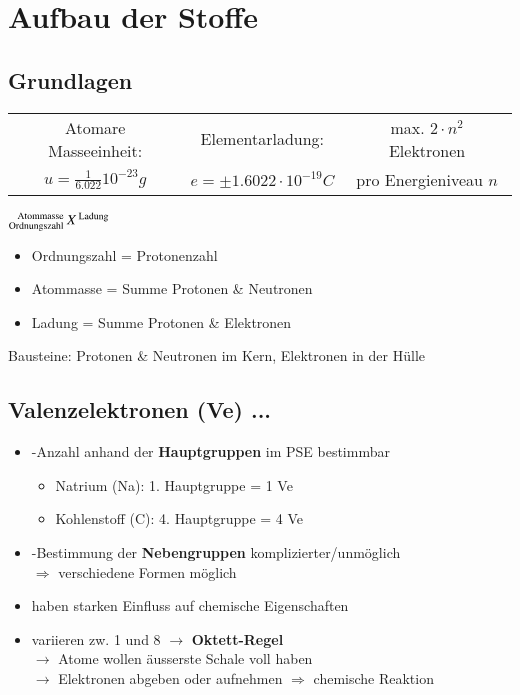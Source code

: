 \section{Aufbau der Stoffe}

\subsection{Grundlagen}
\begin{center}
    \begin{tabular}{|c|c|c|}\hline
        Atomare Masseeinheit:               & Elementarladung:         & max. $2 \cdot n^{2}$ Elektronen \\ 
        $u = \frac{1}{6.022}10^{-23}g$      & $e = \pm 1.6022 \cdot 10^{-19}C$ & pro Energieniveau $n$ \\ \hline
    \end{tabular}
\end{center}


\begin{minipage}{0.25\linewidth}
    $ \prescript{\text{Atommasse }}{\text{Ordnungszahl }}{X}^{\text{ Ladung}} $
\end{minipage}
\hfill
\begin{minipage}{0.65\linewidth}
    \begin{itemize}[itemsep=1pt, parsep=0pt]
        \item Ordnungszahl = Protonenzahl
        \item Atommasse = Summe Protonen \& Neutronen
        \item Ladung = Summe Protonen \& Elektronen
    \end{itemize}
\end{minipage}

Bausteine: Protonen \& Neutronen im Kern, Elektronen in der Hülle

\subsection{Valenzelektronen (Ve) ...}

\begin{itemize}[itemsep=1pt, parsep=0pt]
    \item -Anzahl anhand der \textbf{Hauptgruppen} im PSE bestimmbar
    \begin{itemize}
        \item Natrium (Na): 1. Hauptgruppe = 1 Ve
        \item Kohlenstoff (C): 4. Hauptgruppe = 4 Ve 
    \end{itemize}
    \item -Bestimmung der \textbf{Nebengruppen} komplizierter/unmöglich \\$\Rightarrow$ verschiedene Formen möglich
    \item haben starken Einfluss auf chemische Eigenschaften
    \item variieren zw. 1 und 8 $\rightarrow$ \textbf{Oktett-Regel}\\$\rightarrow$ Atome wollen äusserste Schale voll haben\\$\rightarrow$ Elektronen abgeben oder aufnehmen $\Rightarrow$ chemische Reaktion
\end{itemize}

